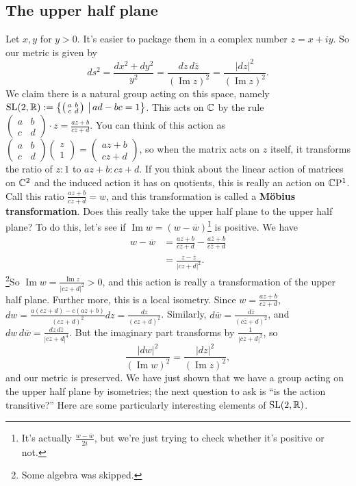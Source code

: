 \subsection{The upper half plane}
Let $x,y$ for $y>0$. It's easier to package them in a complex number $z=x+iy$. So our metric is given by \[
    ds^2 = \frac{dx^2+dy^2}{y^2}= \frac{dz\, d\overline{z}}{(\operatorname{Im}z)^2}=\frac{|dz|^2}{(\operatorname{Im}z)^2}.
\] We claim there is a natural group acting on this space, namely $\operatorname{SL}(2,\mathbb{R}):= \left\{\left( 
\begin{smallmatrix}
    a & b \\ c & d
\end{smallmatrix}\right) \,\big | \,ad-bc=1 \right\} $. This acts on $\mathbb{C}$ by the rule $\left( 
\begin{smallmatrix}
    a & b \\ c & d
\end{smallmatrix}\right) \cdot z= \frac{az+b}{cz+d}$. You can think of this action as $
\left( 
\begin{smallmatrix}
    a & b \\ c & d
\end{smallmatrix}\right) \left( 
\begin{smallmatrix}
    z \\ 1
\end{smallmatrix}\right) =\left( 
\begin{smallmatrix}
    az+b \\ cz+d
\end{smallmatrix}\right) $, so when the matrix acts on $z$ itself, it transforms the ratio of $z:1$ to $az+b: cz+d$. If you think about the linear action of matrices on $\mathbb{C}^2$ and the induced action it has on quotients, this is really an action on $\mathbb{C}\mathrm P^1$. Call this ratio $\frac{az+b}{cz+d}=w$, and this transformation is called a \textbf{M\"obius transformation}. Does this really take the upper half plane to the upper half plane? To do this, let's see if $\operatorname{Im}w=(w-\overline{w})$\footnote{It's actually $\frac{w-\overline{w}}{2i}$, but we're just trying to check whether it's positive or not.} is positive. We have 
\begin{align*}
    w-\overline{w}&=\frac{az+b}{cz+d}-\frac{a\overline{z}+b}{c\overline{z}+d}\\
                  &= \frac{z-\overline{z}}{|cz+d|^2}.
\end{align*}\footnote{Some algebra was skipped.}So $\operatorname{Im}w= \frac{\operatorname{Im}z}{|cz+d|^2}>0$, and this action is really a transformation of the upper half plane. Further more, this is a local isometry. Since $w=\frac{az+b}{cz+d}$, $dw=\frac{a(cz+d)-c(az+b)}{(cz+d)^2}dz=\frac{dz}{(cz+d)^2}$. Similarly, $d\overline{w}= \frac{d\overline{z}}{(c\overline{z}+d)^2}$, and $dw \, d\overline{w}=\frac{dz \, d\overline{z}}{|cz+d|^4}$. But the imaginary part transforms by $\frac{1}{|cz+d|^2}$, so \[
\frac{|dw|^2}{(\operatorname{Im}w)^2}= \frac{|dz|^2}{(\operatorname{Im}z)^2},
\] and our metric is preserved. We have just shown that we have a group acting on the upper half plane by isometries; the next question to ask is ``is the action transitive?'' Here are some particularly interesting elements of $\operatorname{SL}(2,\mathbb{R})$. 
